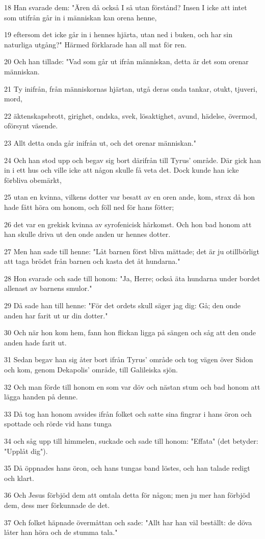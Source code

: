 \par 18 Han svarade dem: "Ären då också I så utan förstånd? Insen I icke att intet som utifrån går in i människan kan orena henne,
\par 19 eftersom det icke går in i hennes hjärta, utan ned i buken, och har sin naturliga utgång?" Härmed förklarade han all mat för ren.
\par 20 Och han tillade: "Vad som går ut ifrån människan, detta är det som orenar människan.
\par 21 Ty inifrån, från människornas hjärtan, utgå deras onda tankar, otukt, tjuveri, mord,
\par 22 äktenskapsbrott, girighet, ondska, svek, lösaktighet, avund, hädelse, övermod, oförsynt väsende.
\par 23 Allt detta onda går inifrån ut, och det orenar människan."
\par 24 Och han stod upp och begav sig bort därifrån till Tyrus' område. Där gick han in i ett hus och ville icke att någon skulle få veta det. Dock kunde han icke förbliva obemärkt,
\par 25 utan en kvinna, vilkens dotter var besatt av en oren ande, kom, strax då hon hade fått höra om honom, och föll ned för hans fötter;
\par 26 det var en grekisk kvinna av syrofenicisk härkomst. Och hon bad honom att han skulle driva ut den onde anden ur hennes dotter.
\par 27 Men han sade till henne: "Låt barnen först bliva mättade; det är ju otillbörligt att taga brödet från barnen och kasta det åt hundarna."
\par 28 Hon svarade och sade till honom: "Ja, Herre; också äta hundarna under bordet allenast av barnens smulor."
\par 29 Då sade han till henne: "För det ordets skull säger jag dig: Gå; den onde anden har farit ut ur din dotter."
\par 30 Och när hon kom hem, fann hon flickan ligga på sängen och såg att den onde anden hade farit ut.
\par 31 Sedan begav han sig åter bort ifrån Tyrus' område och tog vägen över Sidon och kom, genom Dekapolis' område, till Galileiska sjön.
\par 32 Och man förde till honom en som var döv och nästan stum och bad honom att lägga handen på denne.
\par 33 Då tog han honom avsides ifrån folket och satte sina fingrar i hans öron och spottade och rörde vid hans tunga
\par 34 och såg upp till himmelen, suckade och sade till honom: "Effata" (det betyder: "Upplåt dig").
\par 35 Då öppnades hans öron, och hans tungas band löstes, och han talade redigt och klart.
\par 36 Och Jesus förbjöd dem att omtala detta för någon; men ju mer han förbjöd dem, dess mer förkunnade de det.
\par 37 Och folket häpnade övermåttan och sade: "Allt har han väl beställt: de döva låter han höra och de stumma tala."

